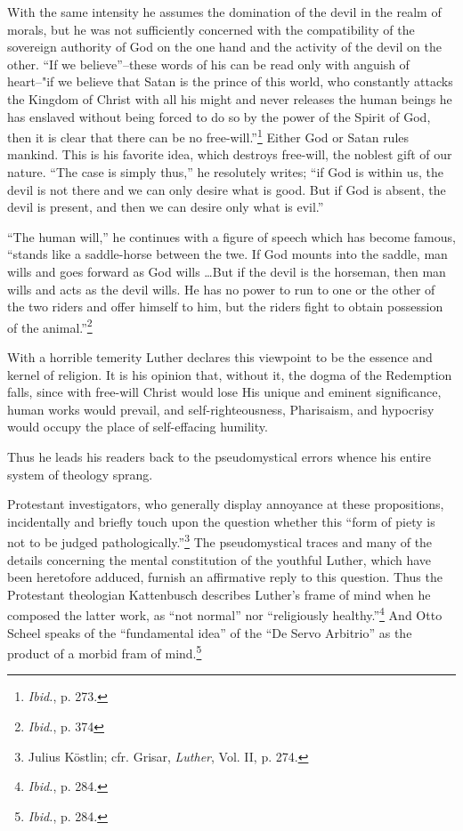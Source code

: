With the same intensity he assumes the domination of the devil in the
realm of morals, but he was not sufficiently concerned with the compatibility
of the sovereign authority of God on the one hand and the activity of the
devil on the other. “If we believe”--these words of his can be read only with
anguish of heart--"if we believe that Satan is the prince of this world, who
constantly attacks the Kingdom of Christ with all his might and never
releases the human beings he has enslaved without being forced to do so by the
power of the Spirit of God, then it is clear that there can be no free-will.”\footnote{\textit{Ibid.}, p. 273.}
Either God or Satan rules mankind. This is his favorite idea, which destroys
free-will, the noblest gift of our nature. “The case is simply thus,”
he resolutely writes; “if God is within us, the devil is not there and we can only
desire what is good. But if God is absent, the devil is present, and then we
can desire only what is evil.”

“The human will,” he continues with a figure of speech which has become
famous, “stands like a saddle-horse between the twe. If God mounts into
the saddle, man wills and goes forward as God wills \dots But if the devil
is the horseman, then man wills and acts as the devil wills. He has no power
to run to one or the other of the two riders and offer himself to him, but
the riders fight to obtain possession of the animal.”\footnote{\textit{Ibid.}, p. 374}

With a horrible temerity Luther declares this viewpoint to be
the essence and kernel of religion. It is his opinion that, without
it, the dogma of the Redemption falls, since with free-will Christ
would lose His unique and eminent significance, human works would
prevail, and self-righteousness, Pharisaism, and hypocrisy would occupy
the place of self-effacing humility.

Thus he leads his readers back to the pseudomystical errors whence
his entire system of theology sprang.

Protestant investigators, who generally display annoyance at these
propositions, incidentally and briefly touch upon the question whether
this “form of piety is not to be judged pathologically.”\footnote
{Julius Köstlin; cfr. Grisar, \textit{Luther}, Vol. II, p. 274.}
The
pseudomystical traces and many of the details concerning the mental
constitution of the youthful Luther, which have been heretofore
adduced, furnish an affirmative reply to this question. Thus the
Protestant theologian Kattenbusch describes Luther’s frame of mind
when he composed the latter work, as “not normal” nor “religiously
healthy.''\footnote{\textit{Ibid.}, p. 284.}
And Otto Scheel speaks of the ``fundamental idea'' of
the ``De Servo Arbitrio'' as the product of a morbid fram of mind.\footnote
{\textit{Ibid.}, p. 284.}

